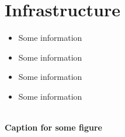 \vspace{-0.8cm}
\section{Infrastructure}

\begin{itemize}[noitemsep,nolistsep]
\item Some information
\item Some information
\item Some information
\item Some information
\end{itemize}
\begin{center}
\\
\small
\textbf{Caption for some figure}
\end{center}
\vspace{-1.6cm}